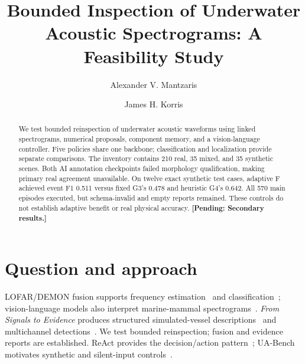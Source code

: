 \documentclass[runningheads,orivec]{llncs}
\newcommand{\pending}[1]{\iffinalresults
  \PackageError{research-results}{Unresolved result or protocol marker}{Resolve the marked item from recorded evidence before submission.}%
  \else\textbf{[Pending: #1]}\fi}
\newif\iffinalresults
\begin{document}
\raggedbottom
\renewcommand{\topfraction}{0.9}
\renewcommand{\bottomfraction}{0.9}
\renewcommand{\textfraction}{0.05}
\renewcommand{\floatpagefraction}{0.85}
\title{Bounded Inspection of Underwater Acoustic Spectrograms: A Feasibility Study}
\author{Alexander V. Mantzaris \and James H. Korris}
\maketitle

\begin{abstract}
We test bounded reinspection of underwater acoustic waveforms using linked spectrograms, numerical proposals, component memory, and a vision-language controller. Five policies share one backbone; classification and localization provide separate comparisons. The inventory contains 210 real, 35 mixed, and 35 synthetic scenes. Both AI annotation checkpoints failed morphology qualification, making primary real agreement unavailable. On twelve exact synthetic test cases, adaptive F achieved event F1 0.511 versus fixed G3's 0.478 and heuristic G4's 0.642. All 570 main episodes executed, but schema-invalid and empty reports remained. These controls do not establish adaptive benefit or real physical accuracy. \pending{Secondary results.}
\end{abstract}

\section{Question and approach}
LOFAR/DEMON fusion supports frequency estimation~\cite{li2022lofar} and classification~\cite{najamuddin2026fusion}; vision-language models also interpret marine-mammal spectrograms~\cite{nihal2025knowledge}. \emph{From Signals to Evidence} produces structured simulated-vessel descriptions~\cite{zhang2026evidence1} and multichannel detections~\cite{li2026evidence2}. We test bounded reinspection; fusion and evidence reports are established. ReAct provides the decision/action pattern~\cite{yao2023react}; UA-Bench motivates synthetic and silent-input controls~\cite{sun2026uabench}.
\end{document}
